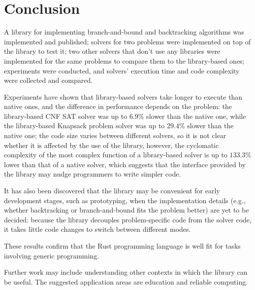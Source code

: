 \chapter{Conclusion}
\label{chap:concl}

A library for implementing branch-and-bound and backtracking algorithms was implemented
and published; solvers for two problems were implemented on top of the library to test it;
two other solvers that don't use any libraries were implemented for the same problems to compare
them to the library-based ones; experiments were conducted, and solvers' execution time and
code complexity were collected and compared.

Experiments have shown that library-based solvers take longer to execute than native ones,
and the difference in performance depends on the problem: the library-based CNF SAT solver
was up to $6.9\%$ slower than the native one, while the library-based Knapsack problem solver was
up to $29.4\%$ slower than the native one; the code size varies between different solvers, so
it is not clear whether it is affected by the use of the library, however, the cyclomatic
complexity of the most complex function of a library-based solver is up to $133.3\%$ lower
than that of a native solver, which suggests that the interface provided by the library may
nudge programmers to write simpler code.

It has also been discovered that the library may be convenient for early development stages,
such as prototyping, when the implementation details (e.g., whether backtracking or
branch-and-bound fits the problem better) are yet to be decided: because the library decouples
problem-specific code from the solver code, it takes little code changes to switch between
different modes.

These results confirm that the Rust programming language is well fit for tasks involving
generic programming.

Further work may include understanding other contexts in which the library can be useful.
The suggested application areas are education and reliable computing.
